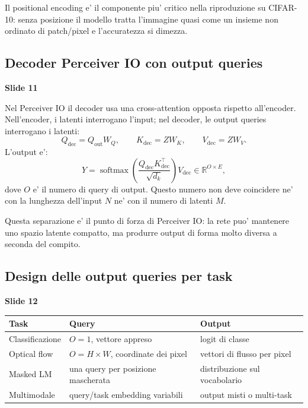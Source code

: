 \documentclass[11pt,a4paper]{article}
\newcommand{\R}{\mathbb{R}}
\newcommand{\softmax}{\operatorname{softmax}}
\newcommand{\slide}[1]{\textcolor{mainblue}{\textbf{Slide #1}}}
\begin{document}
\begin{takeawaybox}[title={Risultato sperimentale piu' forte}]
Il positional encoding e' il componente piu' critico nella riproduzione su
CIFAR-10: senza posizione il modello tratta l'immagine quasi come un insieme
non ordinato di patch/pixel e l'accuratezza si dimezza.
\end{takeawaybox}

\subsection{Decoder Perceiver IO con output queries}
\slide{11}

Nel Perceiver IO il decoder usa una cross-attention opposta rispetto
all'encoder. Nell'encoder, i latenti interrogano l'input; nel decoder, le
output queries interrogano i latenti:
\[
  Q_{\text{dec}} = Q_{\text{out}} W_Q, \qquad
  K_{\text{dec}} = Z W_K, \qquad
  V_{\text{dec}} = Z W_V.
\]
L'output e':
\[
  Y =
  \softmax\!\left(\frac{Q_{\text{dec}}K_{\text{dec}}^\top}{\sqrt{d_k}}\right)
  V_{\text{dec}}
  \in \R^{O \times E},
\]
dove $O$ e' il numero di query di output. Questo numero non deve coincidere ne'
con la lunghezza dell'input $N$ ne' con il numero di latenti $M$.

Questa separazione e' il punto di forza di Perceiver IO: la rete puo' mantenere
uno spazio latente compatto, ma produrre output di forma molto diversa a seconda
del compito.

\subsection{Design delle output queries per task}
\slide{12}

\begin{center}
\begin{tabularx}{\linewidth}{l l X}
\toprule
\textbf{Task} & \textbf{Query} & \textbf{Output} \\
\midrule
Classificazione & $O=1$, vettore appreso & logit di classe \\
Optical flow & $O=H \times W$, coordinate dei pixel & vettori di flusso per pixel \\
Masked LM & una query per posizione mascherata & distribuzione sul vocabolario \\
Multimodale & query/task embedding variabili & output misti o multi-task \\
\bottomrule
\end{tabularx}
\end{center}
\end{document}
